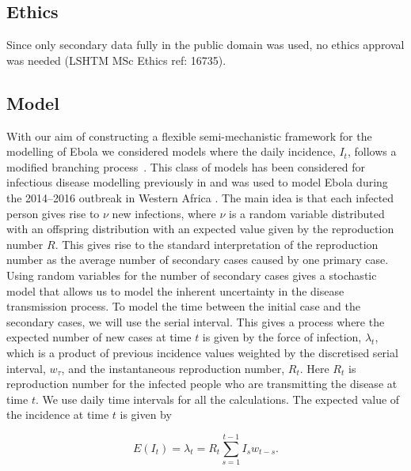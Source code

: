 \documentclass[12pt]{article}
\begin{document}
\subsection{Ethics}
Since only secondary data fully in the public domain was used, no ethics approval was needed (LSHTM MSc Ethics ref: 16735). 

\subsection{Model}

With our aim of constructing a flexible semi-mechanistic framework for the modelling of Ebola we considered models where the daily incidence, $I_t$, follows a modified branching process~\cite{jacobBranchingProcessesTheir2010}. This class of models has been considered for infectious disease modelling previously in \cite{coriNewFrameworkSoftware2013,lloyd-smithSuperspreadingEffectIndividual2005,nouvelletSimpleApproachMeasure2018} and was used to model Ebola during the 2014--2016 outbreak in Western Africa \cite{whoebolaresponseteamEbolaVirusDisease2014, internationalebolaresponseteamExposurePatternsDriving2016}. The main idea is that each infected person gives rise to $\nu$ new infections, where $\nu$ is a random variable distributed with an offspring distribution with an expected value given by the reproduction number $R$. This gives rise to the standard interpretation of the reproduction number as the average number of secondary cases caused by one primary case. Using random variables for the number of secondary cases gives a stochastic model that allows us to model the inherent uncertainty in the disease transmission process. To model the time between the initial case and the secondary cases, we will use the serial interval. This gives a process where the expected number of new cases at time $t$ is given by the force of infection, $\lambda_t$, which is a product of previous incidence values weighted by the discretised serial interval, $w_\tau$, and the instantaneous reproduction number, $R_t$. Here $R_t$ is reproduction number for the infected people who are transmitting the disease at time $t$. We use daily time intervals for all the calculations. The expected value of the incidence at time $t$ is given by

\begin{equation}
  E(I_t) = \lambda_t =  R_t \sum^{t-1}_{s=1} I_s w_{t-s}.
  \label{eq:mean_It}
\end{equation}
\end{document}
